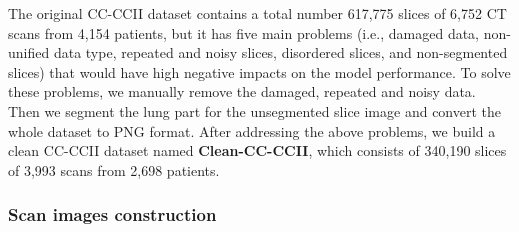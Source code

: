 \documentclass[letterpaper]{article}
\begin{document}
The original CC-CCII dataset contains a total number 617,775 slices of 6,752 CT scans from 4,154 patients, but it has five main problems (i.e., damaged data, non-unified data type, repeated and noisy slices, disordered slices, and non-segmented slices) that would have high negative impacts on the model performance. To solve these problems, we manually remove the damaged, repeated and noisy data. Then we segment the lung part for the unsegmented slice image and convert the whole dataset to PNG format. After addressing the above problems, we build a clean CC-CCII dataset named \textbf{Clean-CC-CCII}, which consists of 340,190 slices of 3,993 scans from 2,698 patients. 





\subsubsection{Scan images construction}

 
    
    
    
    
\end{document}
